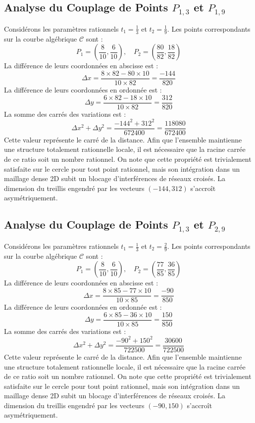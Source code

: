 \documentclass[12pt, a4paper]{article}
\begin{document}
\subsection{Analyse du Couplage de Points $P_{1,3}$ et $P_{1,9}$}
Considérons les paramètres rationnels $t_1 = \frac{1}{3}$ et $t_2 = \frac{1}{9}$.
Les points correspondants sur la courbe algébrique $\mathcal{C}$ sont :
$$ P_1 = \left( \frac{8}{10}, \frac{6}{10} \right), \quad P_2 = \left( \frac{80}{82}, \frac{18}{82} \right) $$
La différence de leurs coordonnées en abscisse est :
$$ \Delta x = \frac{8 \times 82 - 80 \times 10}{10 \times 82} = \frac{-144}{820} $$
La différence de leurs coordonnées en ordonnée est :
$$ \Delta y = \frac{6 \times 82 - 18 \times 10}{10 \times 82} = \frac{312}{820} $$
La somme des carrés des variations est :
$$ \Delta x^2 + \Delta y^2 = \frac{ -144^2 + 312^2 }{ 672400 } = \frac{ 118080 }{ 672400 } $$
Cette valeur représente le carré de la distance. Afin que l'ensemble maintienne une structure totalement rationnelle locale, il est nécessaire que la racine carrée de ce ratio soit un nombre rationnel. On note que cette propriété est trivialement satisfaite sur le cercle pour tout point rationnel, mais son intégration dans un maillage dense 2D subit un blocage d'interférences de réseaux croisés. La dimension du treillis engendré par les vecteurs $( -144, 312 )$ s'accroît asymétriquement.


\subsection{Analyse du Couplage de Points $P_{1,3}$ et $P_{2,9}$}
Considérons les paramètres rationnels $t_1 = \frac{1}{3}$ et $t_2 = \frac{2}{9}$.
Les points correspondants sur la courbe algébrique $\mathcal{C}$ sont :
$$ P_1 = \left( \frac{8}{10}, \frac{6}{10} \right), \quad P_2 = \left( \frac{77}{85}, \frac{36}{85} \right) $$
La différence de leurs coordonnées en abscisse est :
$$ \Delta x = \frac{8 \times 85 - 77 \times 10}{10 \times 85} = \frac{-90}{850} $$
La différence de leurs coordonnées en ordonnée est :
$$ \Delta y = \frac{6 \times 85 - 36 \times 10}{10 \times 85} = \frac{150}{850} $$
La somme des carrés des variations est :
$$ \Delta x^2 + \Delta y^2 = \frac{ -90^2 + 150^2 }{ 722500 } = \frac{ 30600 }{ 722500 } $$
Cette valeur représente le carré de la distance. Afin que l'ensemble maintienne une structure totalement rationnelle locale, il est nécessaire que la racine carrée de ce ratio soit un nombre rationnel. On note que cette propriété est trivialement satisfaite sur le cercle pour tout point rationnel, mais son intégration dans un maillage dense 2D subit un blocage d'interférences de réseaux croisés. La dimension du treillis engendré par les vecteurs $( -90, 150 )$ s'accroît asymétriquement.
\end{document}
